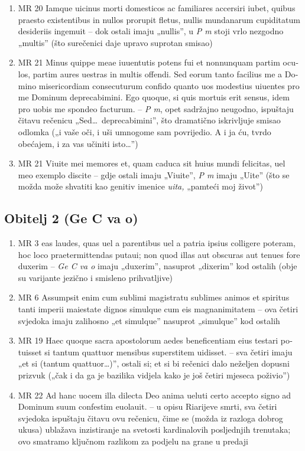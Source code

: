 \documentclass[a5paper,twoside]{article}
\begin{document}
\begin{enumerate}[label=\alph*)]
\item MR 20 \textlatin{Iamque uicinus morti domesticos ac familiares accersiri iubet, quibus praesto existentibus in nullos prorupit fletus, nullis mundanarum cupiditatum desideriis ingemuit} – dok ostali imaju „nullis”, u \textit{P m} stoji vrlo nezgodno „multis” (što surečenici daje upravo suprotan smisao)
\item MR 21 \textlatin{Minus quippe meae iuuentutis potens fui et nonnunquam partim oculos, partim aures uestras in multis offendi. Sed eorum tanto facilius me a Domino misericordiam consecuturum confido quanto uos modestius uiuentes pro me Dominum deprecabimini. Ego quoque, si quis mortuis erit sensus, idem pro uobis me spondeo facturum.} – \textit{P m}, opet sadržajno neugodno, ispuštaju čitavu rečenicu „Sed\dots\ deprecabimini”, što dramatično iskrivljuje smisao odlomka („i vaše oči, i uši umnogome sam povrijedio. A i ja ću, tvrdo obećajem, i za vas učiniti isto\dots”)
\item MR 21 \textlatin{Viuite mei memores et, quam caduca sit huius mundi felicitas, uel meo exemplo discite} – gdje ostali imaju „Viuite”, \textit{P m} imaju „Uite” (što se možda može shvatiti kao genitiv imenice \textit{uita,} „pamteći moj život”)
\end{enumerate}
\subsection{Obitelj 2 (Ge C va o)}
\begin{enumerate}[label=\alph*)]
\item MR 3 \textlatin{eas laudes, quas uel a parentibus uel a patria ipsius colligere poteram, hoc loco praetermittendas putaui; non quod illas aut obscuras aut tenues fore duxerim} – \textit{Ge C va o} imaju „duxerim”, nasuprot „dixerim” kod ostalih (obje su varijante jezično i smisleno prihvatljive)
\item MR 6 \textlatin{Assumpsit enim cum sublimi magistratu sublimes animos et spiritus tanti imperii maiestate dignos simulque cum eis magnanimitatem} – ova četiri svjedoka imaju zalihosno „et simulque” nasuprot „simulque” kod ostalih
\item MR 19 \textlatin{Haec quoque sacra apostolorum aedes beneficentiam eius testari potuisset si tantum quattuor mensibus superstitem uidisset.} – sva četiri imaju „et si (tantum quattuor\dots)”, ostali si; et si bi rečenici dalo neželjen dopusni prizvuk („čak i da ga je bazilika vidjela kako je još četiri mjeseca poživio”)
\item MR 22 \textlatin{Ad hanc uocem illa dilecta Deo anima ueluti certo accepto signo ad Dominum suum confestim euolauit.} – u opisu Riarijeve smrti, sva četiri svjedoka ispuštaju čitavu ovu rečenicu, čime se (možda iz razloga dobrog ukusa) ublažava inzistiranje na svetosti kardinalovih posljednjih trenutaka; ovo smatramo ključnom razlikom za podjelu na grane u predaji
\end{enumerate}
\end{document}
